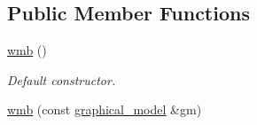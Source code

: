 \subsection*{Public Member Functions}
\begin{DoxyCompactItemize}
\item 
\hypertarget{classmerlin_1_1wmb_ad0c30c53e9d8bbeda74d8d31f62107a9}{}\hyperlink{classmerlin_1_1wmb_ad0c30c53e9d8bbeda74d8d31f62107a9}{wmb} ()\label{classmerlin_1_1wmb_ad0c30c53e9d8bbeda74d8d31f62107a9}

\begin{DoxyCompactList}\small\item\em Default constructor. \end{DoxyCompactList}\item 
\hypertarget{classmerlin_1_1wmb_abef767965df7df0ac02ec38ca531dccd}{}\hyperlink{classmerlin_1_1wmb_abef767965df7df0ac02ec38ca531dccd}{wmb} (const \hyperlink{classmerlin_1_1graphical__model}{graphical\+\_\+model} \&gm)\label{classmerlin_1_1wmb_abef767965df7df0ac02ec38ca531dccd}


\end{DoxyCompactItemize}
